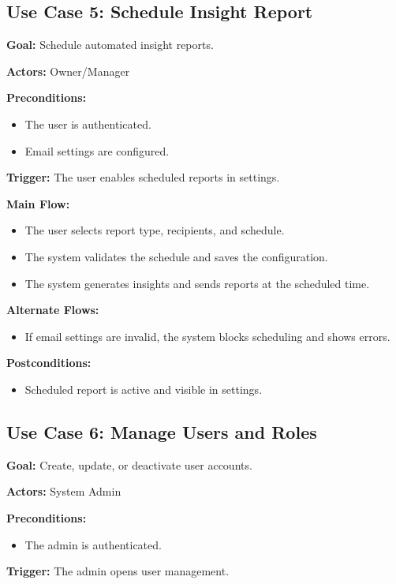 \subsection{Use Case 5: Schedule Insight Report}
\textbf{Goal:} Schedule automated insight reports.

\textbf{Actors:} Owner/Manager

\textbf{Preconditions:}
\begin{itemize}
    \item The user is authenticated.
    \item Email settings are configured.
\end{itemize}

\textbf{Trigger:} The user enables scheduled reports in settings.

\textbf{Main Flow:}
\begin{itemize}
    \item The user selects report type, recipients, and schedule.
    \item The system validates the schedule and saves the configuration.
    \item The system generates insights and sends reports at the scheduled time.
\end{itemize}

\textbf{Alternate Flows:}
\begin{itemize}
    \item If email settings are invalid, the system blocks scheduling and shows errors.
\end{itemize}

\textbf{Postconditions:}
\begin{itemize}
    \item Scheduled report is active and visible in settings.
\end{itemize}

\subsection{Use Case 6: Manage Users and Roles}
\textbf{Goal:} Create, update, or deactivate user accounts.

\textbf{Actors:} System Admin

\textbf{Preconditions:}
\begin{itemize}
    \item The admin is authenticated.
\end{itemize}

\textbf{Trigger:} The admin opens user management.

